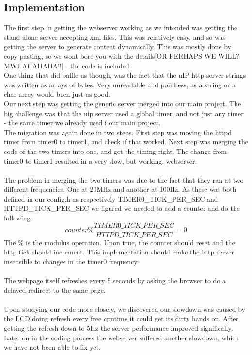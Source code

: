 {\subsection{Implementation}
The first step in getting the webserver working as we intended was getting the stand-alone server accepting xml files. This was relatively easy, and so was getting the server to generate content dynamically. This was mostly done by copy-pasting, so we wont bore you with the details[OR PERHAPS WE WILL? MWUAHAHAHA!!] - the code is included.\\
One thing that did baffle us though, was the fact that the uIP http server strings was written as arrays of bytes. Very unreadable and pointless, as a string or a char array would been just as good.\\
Our next step was getting the generic server merged into our main project. The big challenge was that the uip server used a global timer, and not just any timer - the same timer we already used i our main project.\\
The migration was again done in two steps. First step was moving the httpd timer from timer0 to timer1, and check if that worked. Next step was merging the code of the two timers into one, and get the timing right. The change from timer0 to timer1 resulted in a very slow, but working, webserver.\\\\
The problem in merging the two timers was due to the fact that they ran at two different frequencies. One at 20MHz and another at 100Hz. As these was both defined in our config.h as respectively TIMER0\_TICK\_PER\_SEC and HTTPD\_TICK\_PER\_SEC we figured we needed to add a counter and do the following:
\begin{equation}
  counter \% \frac{TIMER0\_TICK\_PER\_SEC}{HTTPD\_TICK\_PER\_SEC} = 0
\end{equation}
The \% is the modulus operation. Upon true, the counter should reset and the http tick should increment. This implementation should make the http server insensible to changes in the timer0 frequency.\\\\
The webpage itself refreshes every 5 seconds by asking the browser to do a delayed redirect to the same page.\\\\
Upon studying our code more closely, we discovered our slowdown was caused by the LCD doing refresh every free cputime it could get its dirty hands on. After getting the refresh down to 5Hz the server performance improved significally. Later on in the coding process the webserver suffered another slowdown, which we have not been able to fix yet.

}
